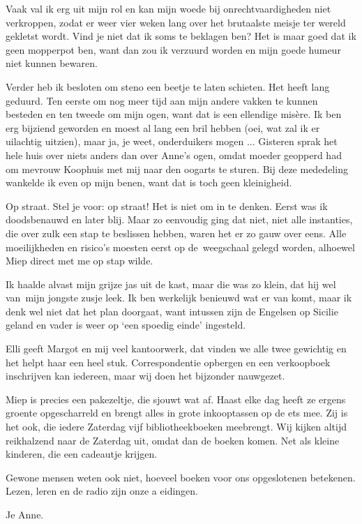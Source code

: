 \documentclass{book}
\begin{document}
Vaak val ik erg uit mijn rol en kan mijn woede bij onrechtvaardigheden
niet verkroppen, zodat er weer vier weken lang over het brutaalste
meisje ter wereld gekletst wordt. Vind je niet dat ik soms te beklagen
ben? Het is maar goed dat ik geen mopperpot ben, want dan zou ik
verzuurd worden en mijn goede humeur niet kunnen bewaren.

Verder heb ik besloten om steno een beetje te laten schieten. Het heeft
lang geduurd. Ten eerste om nog meer tijd aan mijn andere vakken te
kunnen besteden en ten tweede om mijn ogen, want dat is een ellendige
misère. Ik ben erg bijziend geworden en moest al lang een bril hebben
(oei, wat zal ik er uilachtig uitzien), maar ja, je weet, onderduikers
mogen ... Gisteren sprak het hele huis over niets anders dan over Anne's
ogen, omdat moeder geopperd had om mevrouw Koophuis met mij naar den
oogarts te sturen. Bij deze mededeling wankelde ik even op mijn benen,
want dat is toch geen kleinigheid.

Op straat. Stel je voor: op straat! Het is niet om in te denken. Eerst
was ik doodsbenauwd en later blij. Maar zo eenvoudig ging dat niet, niet
alle instanties, die over zulk een stap te beslissen hebben, waren het
er zo gauw over eens. Alle moeilijkheden en risico's moesten eerst op
de~weegschaal gelegd worden, alhoewel Miep direct met me op stap wilde.

Ik haalde alvast mijn grijze jas uit de kast, maar die was zo klein, dat
hij wel van~mijn jongste zusje leek. Ik ben werkelijk benieuwd wat er
van komt, maar ik denk wel niet dat het plan doorgaat, want intussen
zijn de Engelsen op Sicilie geland en vader is weer op `een spoedig
einde' ingesteld.

Elli geeft Margot en mij veel kantoorwerk, dat vinden we alle twee
gewichtig en het helpt haar een heel stuk. Correspondentie opbergen en
een verkoopboek inschrijven kan iedereen, maar wij doen het bijzonder
nauwgezet.

Miep is precies een pakezeltje, die sjouwt wat af. Haast elke dag heeft
ze ergens groente opgescharreld en brengt alles in grote inkooptassen op
de ets mee. Zij is het ook, die iedere Zaterdag vijf bibliotheekboeken
meebrengt. Wij kijken altijd reikhalzend naar de Zaterdag uit, omdat dan
de boeken komen. Net als kleine kinderen, die een cadeautje krijgen.

Gewone mensen weten ook niet, hoeveel boeken voor ons opgeslotenen
betekenen. Lezen, leren en de radio zijn onze a eidingen.

Je Anne.
\end{document}
